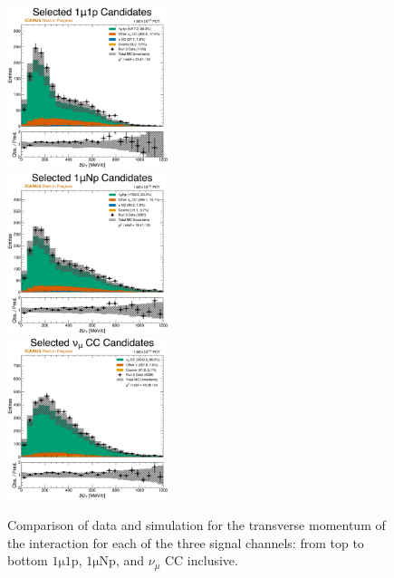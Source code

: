 \begin{figure}
    \centering
    \includegraphics[width=0.42\textwidth]{figures/data_mc_comparisons/datamc_hist1d_1mu1p_delta_pT.pdf}\\
    \includegraphics[width=0.42\textwidth]{figures/data_mc_comparisons/datamc_hist1d_1muNp_delta_pT.pdf}\\
    \includegraphics[width=0.42\textwidth]{figures/data_mc_comparisons/datamc_hist1d_1muX_delta_pT.pdf}\\
    \caption{Comparison of data and simulation for the transverse momentum of the interaction for each of the three signal channels: from top to bottom $\mathrm{1\mu 1p}$, $\mathrm{1\mu Np}$, and $\nu_\mu$ CC inclusive.}
    \label{fig:datamc_delta_pT}
\end{figure}

